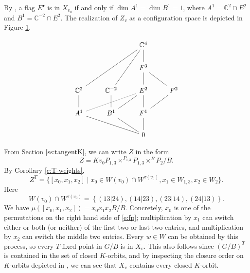 \documentclass[11pt,letterpaper,reqno]{amsart}
\newcommand{\set}[1]{\left\{#1\right\}}
\numberwithin{equation}{section}
\theoremstyle{plain}
\theoremstyle{definition}
\theoremstyle{remark}
\newcommand{\C}{\mathbb{C}}
\begin{document}
By \cite[Corollary 1.3]{Wys}, a flag $E^\bullet$ is in
$X_{v_0}$ if and only if $\dim A^1 = \dim B^1 = 1$, where
$A^1 = \C^2 \cap E^2$ and $B^1 = \C^{-2} \cap E^2$.  
The realization of $Z_v$ as a configuration space is depicted in Figure \ref{Fig3}.  
\begin{figure}[H]
\begin{equation}
\begin{tikzcd}
&&\C^4\\
&&F^3\arrow[u,dash]\\
\C^{2}\arrow[uurr,dash]&\C^{-2}\arrow[uur,dash]&E^2\arrow[u,dash]&F^2\arrow[ul,dash]\arrow[dl,dash]\\
A^1\arrow[urr,gray,dash]\arrow[u,dash]\arrow[drr,dash]&B^1\arrow[ur,dash]\arrow[dr,dash]\arrow[u,dash]&F^1\arrow[u,dash]\\
&&0\arrow[u,dash]
\end{tikzcd}
\end{equation}
\label{Fig3}
\end{figure}


From Section \ref{ss:tangentK}, 
we can write $Z$ in the form
\begin{equation} \label{e:alternative1212}
Z=Kv_0P_{1,3}\times^{P_{1,3}}P_{1,3}\times^{B}P_{2}/B.
\end{equation}
By Corollary \ref{c:T-weights},
\begin{equation} \label{e:zt-example}
Z^T = \{ [x_0, x_1, x_2] \mid x_0 \in W(v_0) \cap W^{\tau(v_0)}, x_1 \in W_{1,3}, x_2 \in W_2\}.
\end{equation}
Here
\begin{equation} \label{e:fp}
W(v_0) \cap W^{\tau(v_0)} = \set{(13|24),(14|23),(23|14),(24|13)}.
\end{equation}
We have $\mu([x_0, x_1, x_2]) = x_0 x_1 x_2 B/B$.  Concretely, $x_0$ is one of the permutations on the right
hand side of \eqref{e:fp}; multiplication by $x_1$ can switch either or both (or neither) of the first two or last two entries,
and multiplication by $x_2$ can switch the middle two entries.  Every \(w\in W\) can be obtained by this process, so
every \(T\)-fixed point in \(G/B\) is in $X_v$.  This also follows since $(G/B)^T$ is contained in the set of closed
$K$-orbits, and by inspecting the closure order on $K$-orbits depicted in \cite{Wys}, we can see that
$X_v$ contains every closed $K$-orbit.
\end{document}
